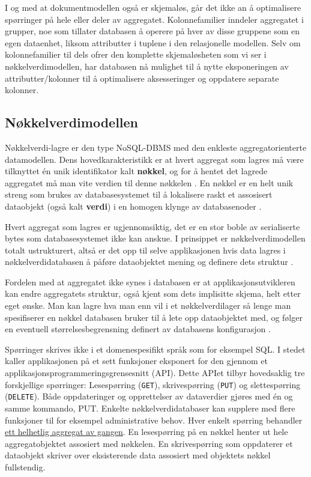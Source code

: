I og med at dokumentmodellen også er skjemaløs, går det ikke an å optimalisere spørringer på hele eller deler av aggregatet. Kolonnefamilier inndeler aggregatet i grupper, noe som tillater databasen å operere på hver av disse gruppene som en egen dataenhet, liksom attributter i tuplene i den relasjonelle modellen. Selv om kolonnefamilier til dels ofrer den komplette skjemaløsheten som vi ser i nøkkel\-verdi\-modellen, har databasen nå mulighet til å nytte eksponeringen av attributter/kolonner til å optimalisere aksesseringer og oppdatere separate kolonner.

\subsection{Nøkkelverdimodellen}

Nøkkelverdi-lagre er den type NoSQL-DBMS med den enkleste aggregatorienterte datamodellen. Dens hovedkarakteristikk er at hvert aggregat som lagres må være tilknyttet én unik identifikator kalt \textbf{nøkkel}, og for å hentet det lagrede aggregatet må man vite verdien til denne nøkkelen \citep{elmasri2014}. En nøkkel er en helt unik streng som brukes av databasesystemet til å lokalisere raskt et assosisert dataobjekt (også kalt \textbf{verdi}) i en homogen klynge av databasenoder \citep{elmasri2014}.

Hvert aggregat som lagres er ugjennomsiktig, det er en stor boble av serialiserte bytes som databasesystemet ikke kan anskue. I prinsippet er nøkkel\-verdi\-modellen totalt ustrukturert, altså er det opp til selve applikasjonen hvis data lagres i nøkkelverdidatabasen å påføre dataobjektet mening og definere dets struktur \citep{elmasri2014}.

Fordelen med at aggregatet ikke synes i databasen er at applikasjonsutvikleren kan endre aggregatets struktur, også kjent som dets implisitte skjema, helt etter eget ønske. Man kan lagre hva man enn vil i et nøkkelverdilager så lenge man spesifiserer en nøkkel databasen bruker til å lete opp dataobjektet med, og følger en eventuell størrelsesbegrensning definert av databasens konfigurasjon \citep{sadalage2013}.

Spørringer skrives ikke i et domenespesifikt språk som for eksempel SQL. I stedet kaller applikasjonen på et sett funksjoner eksponert for den gjennom et applikasjonsprogrammeringsgrensesnitt (API). Dette APIet tilbyr hovedsaklig tre forskjellige spørringer: Lesespørring (\texttt{GET}), skrivespørring (\texttt{PUT}) og slettespørring (\texttt{DELETE}). Både oppdateringer og opprettelser av dataverdier gjøres med én og samme kommando, PUT. Enkelte nøkkelverdidatabaser kan supplere med flere funksjoner til for eksempel administrative behov. Hver enkelt spørring behandler \underline{ett helhetlig aggregat av gangen}. En lesespørring på en nøkkel henter ut hele aggregatobjektet assosiert med nøkkelen. En skrivespørring som oppdaterer et dataobjekt skriver over eksisterende data assosiert med objektets nøkkel fullstendig.

